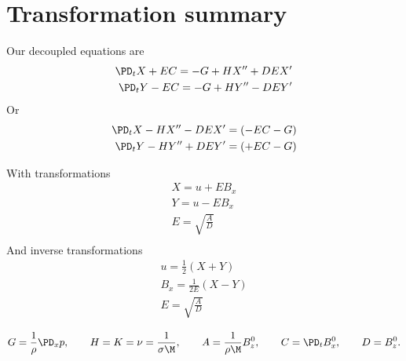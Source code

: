 \documentclass[11pt]{article}
\begin{document}
\section{Transformation summary}
Our decoupled equations are
\begin{equation}\begin{aligned}
\PD_t X + EC = -G+ H X'' + DE X'\\
\PD_t Y - EC = -G+ H Y'' - DE Y'\\
\end{aligned} \end{equation}
Or
\begin{equation}\begin{aligned}
\PD_t X - H X'' - DE X'  = (- EC -G)\\
\PD_t Y - H Y'' + DE Y'  = (+ EC -G)\\
\end{aligned} \end{equation}

With transformations
\begin{equation}\begin{aligned}
X = u + E B_x \\
Y = u - E B_x \\
E = \sqrt{\frac{A}{D}} \\
\end{aligned} \end{equation}
And inverse transformations
\begin{equation}\begin{aligned}
u   = \frac{1}{2} \left( X + Y \right) \\
B_x = \frac{1}{2E} \left( X - Y \right) \\
E = \sqrt{\frac{A}{D}} \\
\end{aligned} \end{equation}
\begin{equation}\begin{aligned}
G = \frac{1}{\rho}\PD_x p, \qquad
H = K = \nu = \frac{1}{\sigma \M}, \qquad
A = \frac{1}{\rho \M} B_z^0, \qquad
C = \PD_t B_x^0, \qquad
D = B_z^0.
\end{aligned} \end{equation}
\end{document}
